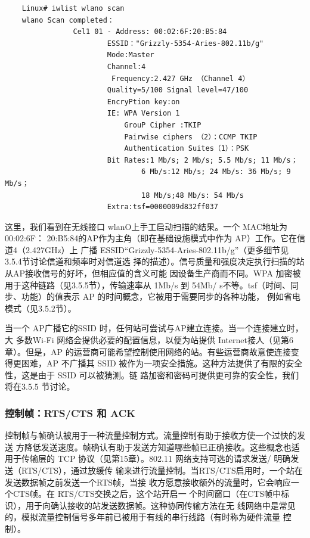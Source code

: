 \begin{verbatim}
    Linux# iwlist wlano scan
    wlano Scan completed：
                Cel1 01 - Address: 00:02:6F:20:B5:84
                        ESSID："Grizzly-5354-Aries-802.11b/g"
                        Mode:Master
                        Channel:4
                         Frequency:2.427 GHz （Channel 4）
                        Quality=5/100 Signal level=47/100
                        EncryPtion key:on
                        IE: WPA Version 1
                            GrouP Cipher :TKIP
                            Pairwise ciphers （2）：CCMP TKIP
                            Authentication Suites（1）：PSK
                        Bit Rates:1 Mb/s; 2 Mb/s; 5.5 Mb/s; 11 Mb/s；
                                6 Mb/s:12 Mb/s; 24 Mb/s: 36 Mb/s; 9 Mb/s；
                                18 Mb/s;48 Mb/s: 54 Mb/s
                        Extra:tsf=0000009d832ff037
\end{verbatim}

这里，我们看到在无线接口 wlanO上手工启动扫描的结果。一个 MAC地址为 00:02:6F：
20:B5:84的AP作为主角（即在基础设施模式中作为 AP）工作。它在信道4（2.427GHz）上
广播 ESSID“Grizzly-5354-Aries-802.11b/g”（更多细节见3.5.4节讨论信道和频率时对信道选
择的描述）。信号质量和强度决定执行扫描的站从AP接收信号的好坏，但相应值的含义可能
因设备生产商而不同。WPA 加密被用于这种链路（见3.5.5节），传输速率从 1Mb/s 到 54Mb/
s不等。tsf（时间、同步、功能）的值表示 AP 的时间概念，它被用于需要同步的各种功能，
例如省电模式（见3.5.2节）。

当一个 AP广播它的SSID 时，任何站可尝试与AP建立连接。当一个连接建立时，大
多数Wi-Fi 网络会提供必要的配置信息，以便为站提供 Internet接人（见第6章）。但是，AP
的运营商可能希望控制使用网络的站。有些运营商故意使连接变得更困难，AP 不广播其
SSID 被作为一项安全措施。这种方法提供了有限的安全性，这是由于 SSID 可以被猜测。链
路加密和密码可提供更可靠的安全性，我们将在3.5.5 节讨论。

\subsubsection{控制帧：RTS/CTS 和 ACK}

控制帧与帧确认被用于一种流量控制方式。流量控制有助于接收方使一个过快的发送
方降低发送速度。帧确认有助于发送方知道哪些帧已正确接收。这些概念也适用于传输层的
TCP 协议（见第15章）。802.11 网络支持可选的请求发送/ 明确发送（RTS/CTS），通过放缓传
输来进行流量控制。当RTS/CTS启用时，一个站在发送数据帧之前发送一个RTS帧，当接
收方愿意接收额外的流量时，它会响应一个CTS帧。在 RTS/CTS交换之后，这个站开启一
个时间窗口（在CTS帧中标识），用于向确认接收的站发送数据帧。这种协同传输方法在无
线网络中是常见的，模拟流量控制信号多年前已被用于有线的串行线路（有时称为硬件流量
控制）。

